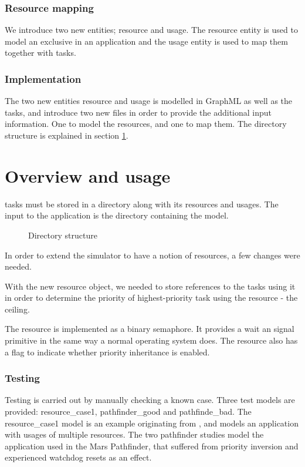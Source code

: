 \documentclass{acm_proc_article-sp}
\begin{document}
\subsubsection{Resource mapping}
We introduce two new entities; resource and usage. The resource entity is used to model an exclusive in an application and the usage entity is used to map them together with tasks.



\subsubsection{Implementation}
The two new entities resource and usage is modelled in GraphML as well as the tasks, and introduce two new files in order to provide the additional input information. One to model the resources, and one to map them. The directory structure is explained in section \ref{sec:overview}.
\section{Overview and usage}
\label{sec:overview}
tasks must be stored in a directory along with its resources and usages. The input to the application is the directory containing the model.
\begin{figure}[h]
\centering
{}
\caption{Directory structure}
\label{fig:directory_structure}
\end{figure}
In order to extend the simulator to have a notion of resources, a few changes were needed.

With the new resource object, we needed to store references to the tasks using it in order to determine the priority of highest-priority task using the resource - the ceiling.

The resource is implemented as a binary semaphore. It provides a wait an signal primitive in the same way a normal operating system does. The resource also has a flag to indicate whether priority inheritance is enabled.
\subsubsection{Testing}
Testing is carried out by manually checking a known case. Three test models are provided: resource\_case1, pathfinder\_good and pathfinde\_bad. The resource\_case1 model is an example originating from \cite{buttazzo1997hard}, and models an application with usages of multiple resources. The two pathfinder studies model the application used in the Mars Pathfinder, that suffered from priority inversion and experienced watchdog resets as an effect.
\end{document}
